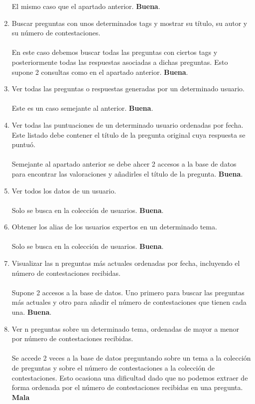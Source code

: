 \documentclass{article}
\begin{document}
\begin{enumerate}
      El mismo caso que el apartado anterior. \textbf{Buena}.
      \item Buscar preguntas con unos determinados tags y mostrar su título, su autor
      y su número de contestaciones. \\ \\
      En este caso debemos buscar todas las preguntas con ciertos tags y posteriormente
      todas las respuestas asociadas a dichas preguntas. Esto supone 2 consultas como 
      en el apartado anterior. \textbf{Buena}.
      \item Ver todas las preguntas o respuestas generadas por un determinado usuario. \\ \\
      Este es un caso semejante al anterior. \textbf{Buena}.
      \item Ver todas las puntuaciones de un determinado usuario ordenadas por fecha.
      Este listado debe contener el título de la pregunta original cuya respuesta
      se puntuó. \\ \\
      Semejante al apartado anterior se debe ahcer 2 accesos a la base de datos para 
      encontrar las valoraciones y añadirles el título de la pregunta. \textbf{Buena}.
      \item Ver todos los datos de un usuario.\\ \\
      Solo se busca en la colección de usuarios. \textbf{Buena}.
      \item Obtener los alias de los usuarios expertos en un determinado tema.\\ \\
      Solo se busca en la colección de usuarios. \textbf{Buena}.
      \item Visualizar las n preguntas más actuales ordenadas por fecha, incluyendo
      el número de contestaciones recibidas.\\ \\
      Supone 2 accesos a la base de datos. Uno primero para buscar las preguntas más actuales
      y otro para añadir el número de contestaciones que tienen cada una. \textbf{Buena}.
      \item Ver n preguntas sobre un determinado tema, ordenadas de mayor a menor
      por número de contestaciones recibidas.\\ \\
      Se accede 2 veces a la base de datos preguntando sobre un tema a la colección de
      preguntas y sobre el número de contestaciones a la colección de contestaciones. Esto 
      ocasiona una dificultad dado que no podemos extraer de forma ordenada por el número de
      contestaciones recibidas en una pregunta. \textbf{Mala}
    \end{enumerate}

    
\end{document}
